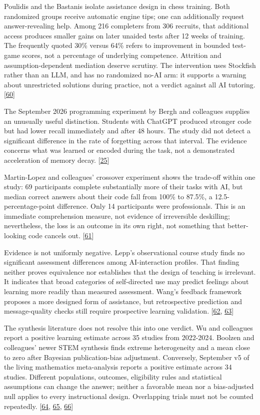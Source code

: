 Poulidis and the Bastanis isolate assistance design in chess training. Both randomized groups receive automatic engine tips; one can additionally request answer-revealing help. Among 216 completers from 306 recruits, that additional access produces smaller gains on later unaided tests after 12 weeks of training. The frequently quoted 30\% versus 64\% refers to improvement in bounded test-game scores, not a percentage of underlying competence. Attrition and assumption-dependent mediation deserve scrutiny. The intervention uses Stockfish rather than an LLM, and has no randomized no-AI arm: it supports a warning about unrestricted solutions during practice, not a verdict against all AI tutoring. [\hyperlink{ref-ref-283d4e8368}{60}]


The September 2026 programming experiment by Bergh and colleagues supplies an unusually useful distinction. Students with ChatGPT produced stronger code but had lower recall immediately and after 48 hours. The study did not detect a significant difference in the rate of forgetting across that interval. The evidence concerns what was learned or encoded during the task, not a demonstrated acceleration of memory decay. [\hyperlink{ref-bergh2026}{25}]


Martin-Lopez and colleagues' crossover experiment shows the trade-off within one study: 69 participants complete substantially more of their tasks with AI, but median correct answers about their code fall from 100\% to 87.5\%, a 12.5-percentage-point difference. Only 14 participants were professionals. This is an immediate comprehension measure, not evidence of irreversible deskilling; nevertheless, the loss is an outcome in its own right, not something that better-looking code cancels out. [\hyperlink{ref-ownership2026}{61}]


Evidence is not uniformly negative. Lepp's observational course study finds no significant assessment differences among AI-interaction profiles. That finding neither proves equivalence nor establishes that the design of teaching is irrelevant. It indicates that broad categories of self-directed use may predict feelings about learning more readily than measured assessment. Wang's feedback framework proposes a more designed form of assistance, but retrospective prediction and message-quality checks still require prospective learning validation. [\hyperlink{ref-lepp2026}{62}, \hyperlink{ref-wang2026}{63}]


The synthesis literature does not resolve this into one verdict. Wu and colleagues report a positive learning estimate across 35 studies from 2022-2024. Boolzen and colleagues' newer STEM synthesis finds extreme heterogeneity and a mean close to zero after Bayesian publication-bias adjustment. Conversely, September v5 of the living mathematics meta-analysis reports a positive estimate across 34 studies. Different populations, outcomes, eligibility rules and statistical assumptions can change the answer; neither a favorable mean nor a bias-adjusted null applies to every instructional design. Overlapping trials must not be counted repeatedly. [\hyperlink{ref-wulearning2026}{64}, \hyperlink{ref-boolzen2026}{65}, \hyperlink{ref-llamalima2026}{66}]


